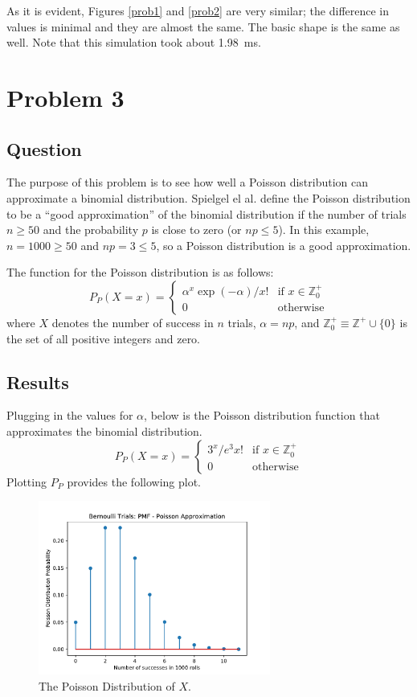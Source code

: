 \documentclass{article}
\begin{document}
As it is evident, Figures \ref{prob1} and \ref{prob2} are
very similar; the difference in values is minimal and they
are almost the same. The basic shape is the same as well.
Note that this simulation took about \SI{1.98}{ms}.

\section{Problem 3}
\subsection{Question} The purpose of this problem is to see
how well a Poisson distribution can approximate a binomial
distribution. Spielgel el al. define the Poisson
distribution to be a ``good approximation'' of the binomial
distribution if the number of trials \(n \ge 50\) and
the probability \(p\) is close to zero (or \(np \le 5\)).
In this example, \(n = \num{1000} \ge 50\) and
\(np = 3 \le 5\), so a Poisson distribution is a good
approximation.

The function for the Poisson distribution is as follows:
\begin{equation*}
    P_P(X = x) =
    \begin{cases}
        \alpha^x \exp(-\alpha)/x! & \text{if } x \in \mathbb{Z}^{+}_0\\
        0 & \text{otherwise}
    \end{cases}
\end{equation*} where \(X\) denotes the number of success
in \(n\) trials, \(\alpha = np\), and \(\mathbb{Z}_0^{+}
\equiv \mathbb{Z}^{+} \cup \{0\}\) is the set of all positive
integers and zero.

\subsection{Results} Plugging in the values for \(\alpha\),
below is the Poisson distribution function that approximates
the binomial distribution.
\begin{equation*}
    P_P(X = x) =
    \begin{cases}
        3^x/e^3x! & \text{if } x \in \mathbb{Z}^+_0\\
        0 & \text{otherwise}
    \end{cases}
\end{equation*} Plotting \(P_P\) provides the following plot.

\begin{figure}[H]
    \centering
    \includegraphics[height=162pt]{Images/Figure_3}
    \caption{The Poisson Distribution of \(X\).}
    \label{prob3}
\end{figure}
\end{document}
